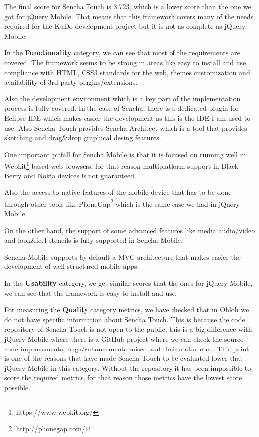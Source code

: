 \documentclass[a4paper,12pt]{book}
\begin{document}
The final score for Sencha Touch is 3.723, which is a lower score than the one we got for jQuery Mobile. That means that this framework covers many of the needs required for the KuDo development project but it is not as complete as jQuery Mobile.

In the \textbf{Functionality} category, we can see that most of the requirements are covered. The framework seems to be strong in areas like easy to install and use, compliance with HTML, CSS3 standards for the web, themes customization and availability of 3rd party plugins/extensions. 

Also the development environment which is a key part of the implementation process is fully covered. In the case of Sencha, there is a dedicated plugin for Eclipse IDE\cite{sencha Eclipse Plugin}  which makes easier the development as this is the IDE I am used to use. Also Sencha Touch provides Sencha Architect\cite{sencha Architect} which is a tool that provides sketching and drag\&drop graphical desing features.

One important pitfall for Sencha Mobile is that it is focused on running well in Webkit\footnote{https://www.webkit.org/}  based web browsers, for that reason multiplatform support in Black Berry and Nokia devices is not guaranteed.

Also the access to native features of the mobile device that has to be done through other tools like PhoneGap\footnote{http://phonegap.com/} which is the same case we had in jQuery Mobile. 

On the other hand, the support of some advanced features like media audio/video and look\&feel stencils is fully supported in Sencha Mobile.

Sencha Mobile supports by default a MVC architecture\cite{sencha MVC}  that makes easier the development of well-structured mobile apps.

In the \textbf{Usability} category, we get similar scores that the ones for jQuery Mobile, we can see that the framework is easy to install and use.

For measuring the \textbf{Quality} category metrics, we have checked that in Ohloh we do not have specific information about Sencha Touch\cite{Ohloh Sencha Touch}. This is because the code repository of Sencha Touch is not open to the public, this is a big difference with jQuery Mobile where there is a GitHub project where we can check the source code improvements, bugs/enhancements raised and their status etc... This point is one of the reasons that have made Sencha Touch to be evaluated lower that jQuery Mobile in this category. Without the repository it has been impossible to score the required metrics, for that reason those metrics have the lowest score possible.
\end{document}
